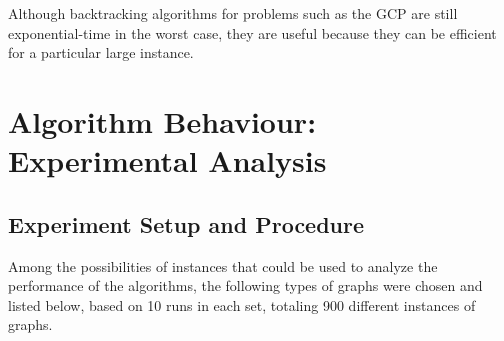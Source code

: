 \documentclass{article}
\begin{document}
Although backtracking algorithms for problems such as the GCP are still exponential-time in the worst case, they are useful because they can be efficient for a particular large instance.











\section{Algorithm Behaviour: Experimental Analysis}




\subsection{Experiment Setup and Procedure}

Among the possibilities of instances that could be used to analyze the performance of the algorithms, the following types of graphs were chosen and listed below, based on 10 runs in each set, totaling 900 different instances of graphs.
\end{document}
